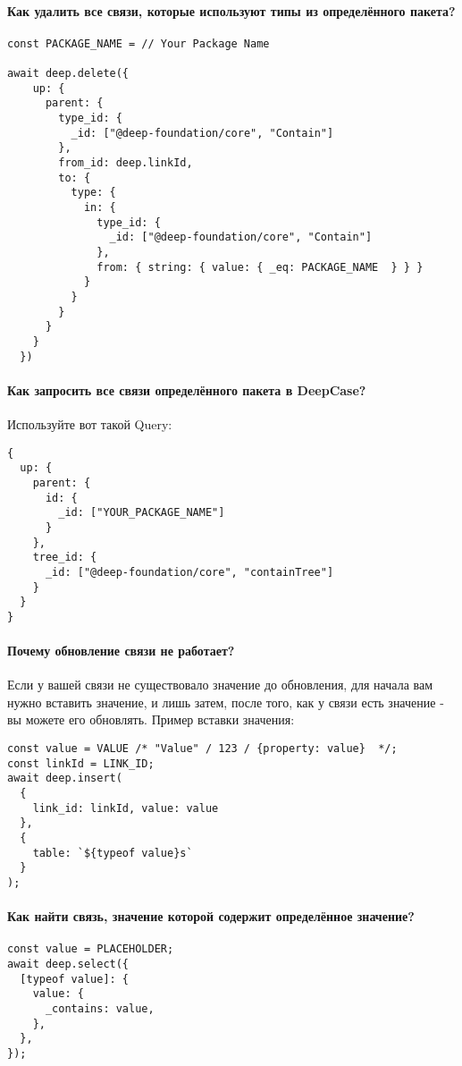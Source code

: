 \paragraph{Как удалить все связи, которые используют типы из определённого пакета?}
\begin{verbatim}
const PACKAGE_NAME = // Your Package Name

await deep.delete({
    up: {
      parent: {
        type_id: {
          _id: ["@deep-foundation/core", "Contain"]
        },
        from_id: deep.linkId,
        to: {
          type: {
            in: {
              type_id: {
                _id: ["@deep-foundation/core", "Contain"]
              },
              from: { string: { value: { _eq: PACKAGE_NAME  } } }
            }
          }
        }
      }
    }
  })
\end{verbatim}
\paragraph{Как запросить все связи определённого пакета в DeepCase?}
Используйте вот такой Query:
\begin{verbatim}
{
  up: {
    parent: {
      id: {
        _id: ["YOUR_PACKAGE_NAME"]
      }
    },
    tree_id: {
      _id: ["@deep-foundation/core", "containTree"]
    }
  }
}
\end{verbatim}
\paragraph{Почему обновление связи не работает?}
Если у вашей связи не существовало значение до обновления, для начала вам нужно вставить значение, и лишь затем, после того, как у связи есть значение - вы можете его обновлять.
Пример вставки значения:
\begin{verbatim}
const value = VALUE /* "Value" / 123 / {property: value}  */;
const linkId = LINK_ID;
await deep.insert(
  {
    link_id: linkId, value: value 
  },
  {
    table: `${typeof value}s`
  }
);
\end{verbatim}
\paragraph{Как найти связь, значение которой содержит определённое значение?}
\begin{verbatim}
const value = PLACEHOLDER;
await deep.select({
  [typeof value]: {
    value: {
      _contains: value,
    },
  },
});
\end{verbatim}